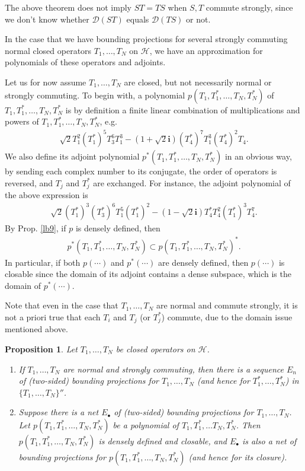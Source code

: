 \documentclass[12pt,b5paper,notitlepage]{article}
\theoremstyle{definition}
\theoremstyle{plain}
\newtheorem{pp}[df]{Proposition}
\newcommand{\mc}{\mathcal}
\newcommand{\Dom}{\scr D}
\newcommand{\scr}{\mathscr}
\newcommand{\im}{\mathbf{i}}
\newcommand{\blt}{\bullet}
\numberwithin{equation}{section}
\begin{document}
The above theorem does not imply $ST=TS$ when $S,T$ commute strongly, since we don't know whether $\Dom(ST)$ equals $\Dom(TS)$ or not.







In the case that we have bounding projections for several strongly commuting normal closed operators $T_1,\dots,T_N$ on $\mc H$, we have an approximation for polynomials of these operators and adjoints. 

Let us for now assume $T_1,\dots,T_N$ are closed, but not necessarily normal or strongly commuting. To begin with, a polynomial $p(T_1,T_1^*,\dots,T_N,T_N^*)$ of $T_1,T_1^*,\dots,T_N,T_N^*$ is by definition a finite linear combination of multiplications and powers of  $T_1,T_1^*,\dots,T_N,T_N^*$, e.g.
\begin{align*}
\sqrt 2 T_1^2(T_1^*)^5T_3^6T_1^3-(1+\sqrt 2\im)(T_4^*)^7T_1^3(T_4^*)^2T_4.
\end{align*}
We also define its adjoint polynomial $p^*(T_1,T_1^*,\dots,T_N,T_N^*)$ in an obvious way, by sending each complex number to its conjugate, the order of operators is reversed, and $T_j$ and $T_j^*$ are exchanged. For instance, the adjoint polynomial of the above expression is 
\begin{align*}
\sqrt 2 (T_1^*)^3(T_3^*)^6T_1^5(T_1^*)^2-(1-\sqrt 2\im)T_4^*T_4^2(T_1^*)^3T_4^7.
\end{align*}
By Prop. \ref{lb9}, if $p$ is densely defined, then
\begin{align}
p^*(T_1,T_1^*,\dots,T_N,T_N^*)\subset p(T_1,T_1^*,\dots,T_N,T_N^*)^*.	\label{eq14}
\end{align}
In particular, if both $p(\cdots)$ and $p^*(\cdots)$ are densely defined, then $p(\cdots)$ is closable since the domain of its adjoint contains a dense subspace, which is the domain of $p^*(\cdots)$.


Note that even in the case that $T_1,\dots,T_N$ are normal and commute strongly, it is not a priori true that each $T_i$ and $T_j$ (or $T_j^*$) commute, due to the domain issue mentioned above.



\begin{pp}\label{lb43}
Let $T_1,\dots,T_N$ be closed operators on $\mc H$. 
\begin{enumerate}
\item  If $T_1,\dots,T_N$ are normal and strongly commuting, then there is a sequence $E_n$ of (two-sided) bounding projections for $T_1,\dots,T_N$ (and hence for $T_1^*,\dots,T_N^*$) in $\{T_1,\dots,T_N\}''$.
\item Suppose there is a net $E_\blt$ of (two-sided) bounding projections for $T_1,\dots,T_N$. Let $p(T_1,T_1^*,\dots,T_N,T_N^*)$ be a polynomial of $T_1,T_1^*,\dots T_N,T_N^*$. Then $p(T_1,T_1^*,\dots,T_N,T_N^*)$ is densely defined and closable, and $E_\blt$  is also a net of bounding projections for $p(T_1,T_1^*,\dots,T_N,T_N^*)$ (and hence for its closure).
\end{enumerate}
\end{pp}	
\end{document}
